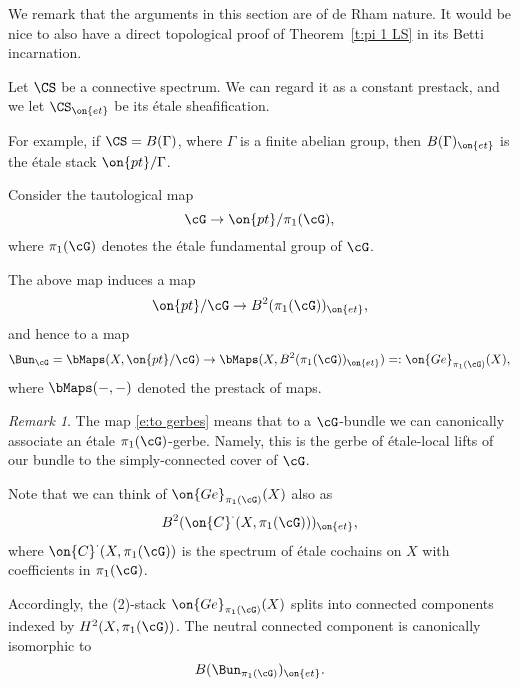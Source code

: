 \documentclass[9pt]{amsart}
\theoremstyle{remark}
\newtheorem{rem}[subsubsection]{Remark}
\theoremstyle{definition}
\theoremstyle{remark}
\newcommand{\thmref}[1]{Theorem~\ref{#1}}
\numberwithin{equation}{section}
\begin{document}
\medskip 

We remark that the arguments in this section are of de Rham nature.
It would be nice to also have a direct topological proof of
\thmref{t:pi 1 LS} in its Betti incarnation.


\sssec{}

Let $\CS$ be a connective spectrum. We can regard it as a constant prestack, and we let
$\CS_{\on{et}}$ be its \'etale sheafification. 

\medskip

For example, if $\CS=B(\Gamma)$, where $\Gamma$ is a finite abelian group, then $B(\Gamma)_{\on{et}}$
is the \'etale stack $\on{pt}/\Gamma$.




\sssec{}

Consider the tautological map 
$$\cG\to \on{pt}/\pi_1(\cG),$$
where $\pi_1(\cG)$ denotes the \'etale fundamental group of $\cG$.

\medskip

The above map induces a map
$$\on{pt}/\cG\to B^2(\pi_1(\cG))_{\on{et}},$$
and hence to a map 
\begin{equation} \label{e:to gerbes}
\Bun_\cG=\bMaps(X,\on{pt}/\cG)\to \bMaps(X,B^2(\pi_1(\cG))_{\on{et}})=:\on{Ge}_{\pi_1(\cG)}(X),
\end{equation}
where $\bMaps(-,-)$ denoted the prestack of maps. 

\begin{rem}
The map \eqref{e:to gerbes} means that to a $\cG$-bundle we can canonically associate an \'etale $\pi_1(\cG)$-gerbe. Namely,
this is the gerbe of \'etale-local lifts of our bundle to the simply-connected cover of $\cG$.
\end{rem} 

\sssec{}

Note that we can think of $\on{Ge}_{\pi_1(\cG)}(X)$ also as
$$B^2(\on{C}^\cdot(X,\pi_1(\cG)))_{\on{et}},$$
where $\on{C}^\cdot(X,\pi_1(\cG))$ is the spectrum of \'etale cochains on $X$ with coefficients in $\pi_1(\cG)$.

\medskip

Accordingly, the (2)-stack $\on{Ge}_{\pi_1(\cG)}(X)$ splits into connected components indexed by $H^2(X,\pi_1(\cG))$. 
The neutral connected component is canonically isomorphic to
$$B(\Bun_{\pi_1(\cG)})_{\on{et}}.$$
\end{document}
